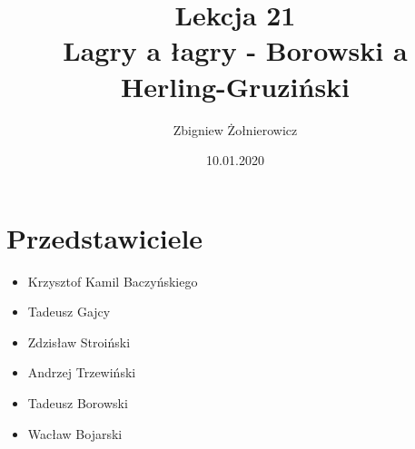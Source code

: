 \documentclass[a4paper]{article}
\begin{document}
\title{{\huge Lekcja 21} \\
{\large Lagry a łagry - Borowski a Herling-Gruziński}}
\author{Zbigniew Żołnierowicz}
\date{10.01.2020}
\maketitle
\section{Przedstawiciele}
\begin{itemize}
    \item Krzysztof Kamil Baczyńskiego
    \item Tadeusz Gajcy
    \item Zdzisław Stroiński
    \item Andrzej Trzewiński
    \item Tadeusz Borowski
    \item Wacław Bojarski
\end{itemize}
\end{document}
